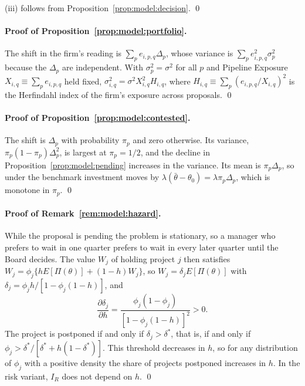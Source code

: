 (iii) follows from Proposition~\ref{prop:model:decision}. \qed

\paragraph{Proof of Proposition~\ref{prop:model:portfolio}.}
The shift in the firm's reading is $\sum_{p}e_{i,p,q}\Delta_p$, whose variance is $\sum_{p}e_{i,p,q}^{2}\sigma_p^{2}$ because the $\Delta_p$ are independent. With $\sigma_p^{2}=\sigma^{2}$ for all $p$ and Pipeline Exposure $X_{i,q}\equiv\sum_pe_{i,p,q}$ held fixed, $\sigma_{i,q}^{2}=\sigma^{2}X_{i,q}^{2}H_{i,q}$, where $H_{i,q}\equiv\sum_p(e_{i,p,q}/X_{i,q})^{2}$ is the Herfindahl index of the firm's exposure across proposals. \qed

\paragraph{Proof of Proposition~\ref{prop:model:contested}.}
The shift is $\Delta_p$ with probability $\pi_p$ and zero otherwise. Its variance, $\pi_p(1-\pi_p)\Delta_p^{2}$, is largest at $\pi_p=1/2$, and the decline in Proposition~\ref{prop:model:pending} increases in the variance. Its mean is $\pi_p\Delta_p$, so under the benchmark investment moves by $\lambda(\bar\theta-\theta_0)=\lambda\pi_p\Delta_p$, which is monotone in $\pi_p$. \qed

\paragraph{Proof of Remark~\ref{rem:model:hazard}.}
While the proposal is pending the problem is stationary, so a manager who prefers to wait in one quarter prefers to wait in every later quarter until the Board decides. The value $W_j$ of holding project $j$ then satisfies $W_j=\phi_j\{hE[\Pi(\theta)]+(1-h)W_j\}$, so $W_j=\delta_jE[\Pi(\theta)]$ with $\delta_j=\phi_jh/[1-\phi_j(1-h)]$, and
\[
  \frac{\partial\delta_j}{\partial h}=\frac{\phi_j(1-\phi_j)}{[1-\phi_j(1-h)]^{2}}>0.
\]
The project is postponed if and only if $\delta_j>\delta^{*}$, that is, if and only if $\phi_j>\delta^{*}/[\delta^{*}+h(1-\delta^{*})]$. This threshold decreases in $h$, so for any distribution of $\phi_j$ with a positive density the share of projects postponed increases in $h$. In the risk variant, $I_R$ does not depend on $h$. \qed
